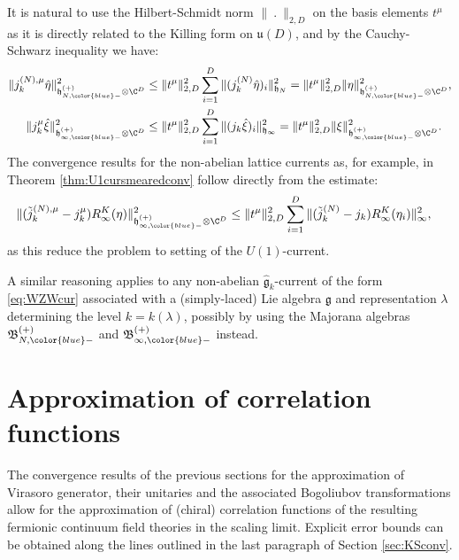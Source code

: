 \documentclass[a4paper, 11pt]{article}
\newcommand{\fB}{\mathfrak{B}}\newcommand{\cB}{\mathcal{B}}\newcommand{\dB}{\mathds{B}}\newcommand{\sB}{\mathscr{B}}
\newcommand{\fg}{\mathfrak{g}}
\newcommand{\fh}{\mathfrak{h}}
\newcommand{\fu}{\mathfrak{u}}
\DeclareMathOperator{\1}{\mathds{1}}
\begin{document}
It is natural to use the Hilbert-Schmidt norm $\|\!\ .\!\ \|_{2,D}$ on the basis elements $t^{\mu}$ as it is directly related to the Killing form on $\fu(D)$, and by the Cauchy-Schwarz inequality we have:
\begin{align}
\label{eq:WZWcur1pestimate}
\|j^{(N),\mu}_{k}\hat{\eta}\|_{\fh^{(+)}_{N,{\color{blue}-}}\otimes\C^{D}}^{2} & \leq \|t^{\mu}\|_{2,D}^{2}\sum_{i=1}^{D}\|(j^{(N)}_{k}\hat{\eta})_{i}\|_{\fh_{N}}^{2} = \|t^{\mu}\|_{2,D}^{2}\|\eta\|_{\fh^{(+)}_{N,{\color{blue}-}}\otimes\C^{D}}^{2}, \\ \nonumber
\|j^{\mu}_{k}\hat{\xi}\|_{\fh^{(+)}_{\infty,{\color{blue}-}}\otimes\C^{D}}^{2} & \leq \|t^{\mu}\|_{2,D}^{2}\sum_{i=1}^{D}\|(j_{k}\hat{\xi})_{i}\|_{\fh_{\infty}}^{2} = \|t^{\mu}\|_{2,D}^{2}\|\xi\|_{\fh^{(+)}_{\infty,{\color{blue}-}}\otimes\C^{D}}^{2}.
\end{align}
The convergence results for the non-abelian lattice currents as, for example, in Theorem \ref{thm:U1cursmearedconv} follow directly from the estimate:
\begin{align}
\label{eq:WZWcur1pconvestimate}
\|(\tilde{j}^{(N),\mu}_{k}-j^{\mu}_{k})R^{K}_{\infty}(\eta)\|_{\fh^{(+)}_{\infty,{\color{blue}-}}\otimes\C^{D}}^{2} & \leq \|t^{\mu}\|_{2,D}^{2}\sum_{i=1}^{D}\|(\tilde{j}^{(N)}_{k}-j_{k})R^{K}_{\infty}(\eta_{i})\|_{\infty}^{2},
\end{align}
as this reduce the problem to setting of the $U(1)$-current.

\bigskip

A similar reasoning applies to any non-abelian $\hat{\fg}_{k}$-current of the form \eqref{eq:WZWcur} associated with a (simply-laced) Lie algebra $\fg$ and representation $\lambda$ determining the level $k = k(\lambda)$, possibly by using the Majorana algebras $\fB^{(+)}_{N,{\color{blue}-}}$ and $\fB^{(+)}_{\infty,{\color{blue}-}}$ instead.

\section{Approximation of correlation functions}
\label{sec:corr}
The convergence results of the previous sections for the approximation of Virasoro generator, their unitaries and the associated Bogoliubov transformations allow for the approximation of (chiral) correlation functions of the resulting fermionic continuum field theories in the scaling limit. Explicit error bounds can be obtained along the lines outlined in the last paragraph of Section \ref{sec:KSconv}.
\end{document}
